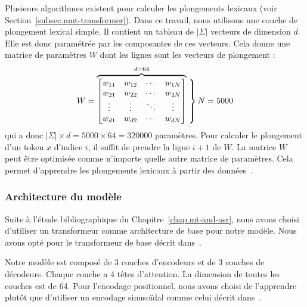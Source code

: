 Plusieurs algorithmes existent pour calculer les plongements lexicaux (voir Section~\ref{subsec.nmt-transformer}).
Dans ce travail, nous utilisons une couche de plongement lexical simple.
Il contient un tableau de \(|\Sigma|\) vecteurs de dimension \(d\).
Elle est donc paramétrée par les composantes de ces vecteurs.
Cela donne une matrice de paramètres \(W\) dont les lignes sont les vecteurs de plongement :
\begin{equation}
    W = \overbrace{
    \begin{bmatrix}
        w_{11} & w_{12} & \cdots & w_{1N}\\
        w_{21} & w_{22} & \cdots & w_{2N}\\
        \vdots & \vdots & \ddots & \vdots\\
        w_{d1} & w_{d2} & \cdots & w_{dN}\\
    \end{bmatrix}}^{d = 64}
    \left.\vphantom{
        \begin{bmatrix}
            w_{11} & w_{12} & \cdots & w_{1N}\\
            w_{21} & w_{22} & \cdots & w_{2N}\\
            \vdots & \vdots & \ddots & \vdots\\
            w_{d1} & w_{d2} & \cdots & w_{dN}\\
        \end{bmatrix}}\right\}N = 5000
\end{equation}
qui a donc \(|\Sigma| \times d = 5000 \times 64 = 320000\) paramètres.
Pour calculer le plongement d'un token \(x\) d'indice \(i\), il suffit de prendre la ligne \(i+1\) de \(W\).
La matrice \(W\) peut être optimisée comme n'importe quelle autre matrice de paramètres.
Cela permet d'apprendre les plongements lexicaux à partir des données~\cite{Paszke_et_al_2019}.


\subsubsection{Architecture du modèle}

Suite à l'étude bibliographique du Chapitre~\ref{chap.mt-and-asr}, 
nous avons choisi d'utiliser un transformeur comme architecture de base pour notre modèle.
Nous avons opté pour le transformeur de base décrit dans~\cite{attention}.

Notre modèle est composé de 3 couches d'encodeurs et de 3 couches de décodeurs.
Chaque couche a 4 têtes d'attention.
La dimension de toutes les couches est de 64.
Pour l'encodage positionnel, nous avons choisi de l'apprendre plutôt que d'utiliser un encodage sinusoïdal
comme celui décrit dans~\cite{attention}.
